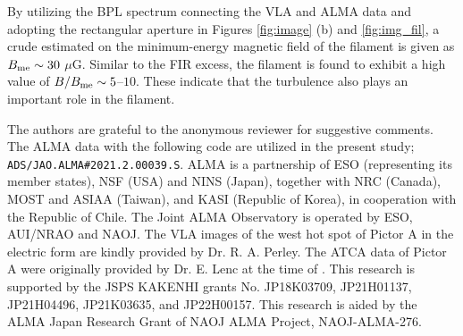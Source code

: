 \documentclass[twocolumn]{aastex631}
\begin{document}
By utilizing the BPL spectrum connecting the VLA and ALMA data
and adopting the rectangular aperture 
in Figures \ref{fig:image} (b) and \ref{fig:img_fil},
a crude estimated on the minimum-energy magnetic field of 
the filament is given as $B_{\rm me} \sim 30 $ $\mu$G.
Similar to the FIR excess, the filament is found to exhibit 
a high value of $B/B_{\rm me} \sim 5$--$10$.
These indicate that the turbulence also plays 
an important role in the filament. 

\begin{acknowledgments}
The authors are grateful to the anonymous reviewer for suggestive comments.
The ALMA data with the following code are utilized in the present study; 
{\tt ADS/JAO.ALMA\#2021.2.00039.S}. 
ALMA is a partnership of ESO (representing its member states), NSF (USA) and NINS (Japan), together with NRC (Canada), MOST and ASIAA (Taiwan), and KASI (Republic of Korea), in cooperation with the Republic of Chile. The Joint ALMA Observatory is operated by ESO, AUI/NRAO and NAOJ.
The VLA images of the west hot spot of Pictor A 
in the electric form are kindly provided by Dr. R. A. Perley.
The ATCA data of Pictor A were originally 
provided by Dr. E. Lenc at the time of \citet{isobe2017}.
This research is supported by the JSPS KAKENHI grants 
No. JP18K03709, JP21H01137, JP21H04496, JP21K03635, and JP22H00157. 
This research is aided 
by the ALMA Japan Research Grant of NAOJ ALMA Project, NAOJ-ALMA-276. 
\end{acknowledgments}




\end{document}
